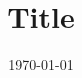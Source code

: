 \newcommand{\mtitle}{Title}
\title{\mtitle}
\newcommand{\subtitle}{Subtitle}
\newcommand{\mauthor}{Author Name}
\date{\today{}}
\newcommand{\minstitute}{HAW Hamburg - DMI - Department Medientechnik}
\newcommand{\mlecture}{Lecture}